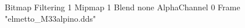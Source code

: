 {Bitmap
	{Filtering 1}
	{Mipmap 1}
	{Blend none}
	{AlphaChannel 0}
	{Frame "elmetto_M33alpino.dds"}
}
